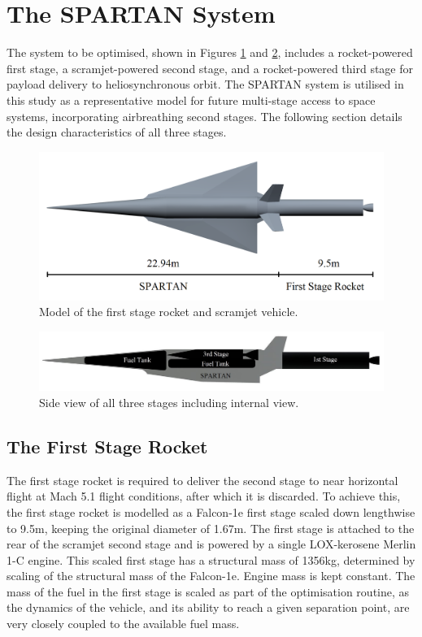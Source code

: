 \documentclass[]{aiaa-tc}
\begin{document}
\section{The SPARTAN System} \label{section:system}

The system to be optimised, shown in Figures \ref{fig:NoInternal} and \ref{fig:INTERNALS}, includes a rocket-powered first stage, a scramjet-powered second stage, and a rocket-powered third stage for payload delivery to heliosynchronous orbit. The SPARTAN system \cite{Preller2015a,Jazra2013,Preller2017}  is utilised in this study as a representative model for future multi-stage access to space systems, incorporating airbreathing second stages. The following section details the design characteristics of all three stages.

\begin{figure}[ht]
	\centering
	\includegraphics[width=.8\linewidth]{NoInternal}
	\caption{Model of the first stage rocket and scramjet vehicle.}
	\label{fig:NoInternal}
\end{figure}


\begin{figure}[ht]
	\centering
	\includegraphics[width=0.8\linewidth]{INTERNALS}
	\caption{Side view of all three stages including internal view.}
	\label{fig:INTERNALS}
\end{figure}

\subsection{The First Stage Rocket}




The first stage rocket is required to deliver the second stage to near horizontal flight at Mach 5.1 flight conditions, after which it is discarded. To achieve this, the first stage rocket is modelled as a Falcon-1e first stage scaled down lengthwise to 9.5m, keeping the original diameter of 1.67m\cite{Vehicle2008}. The first stage is attached to the rear of the scramjet second stage and is powered by a single LOX-kerosene Merlin 1-C engine.  This scaled first stage has a structural mass of 1356kg, determined by scaling of the structural mass of the Falcon-1e. Engine mass is kept constant. The mass of the fuel in the first stage is scaled as part of the optimisation routine, as the dynamics of the vehicle, and its ability to reach a given separation point, are very closely coupled to the available fuel mass. 
\end{document}
